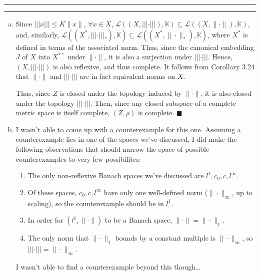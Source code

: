 \documentclass[11pt]{article}
\newcounter{questionCounter}
\newcounter{partCounter}[questionCounter]
\newenvironment{question}[2][\arabic{questionCounter}]{%
    \setcounter{partCounter}{0}%
    \vspace{.25in} \hrule \vspace{0.5em}%
        \noindent{\bf #2}%
    \vspace{0.8em} \hrule \vspace{.10in}%
    \addtocounter{questionCounter}{1}%
}{}
\renewcommand{\qed}{\quad $\blacksquare$}
\newcommand{\K}{\mathbb{K}} %
\renewcommand{\L}{\mathcal{L}} %
\begin{document}
\begin{question}{Problem 6}
\begin{enumerate}[(a)]
\item Since $|||x||| \leq K\|x\|$, $\forall x \in X$,
$\L((X,|||\cdot|||),\K) \subseteq \L((X,\|\cdot\|),\K)$, and, similarly,
$\L((X^*,|||\cdot|||_*),\K) \subseteq \L((X^*,\|\cdot\|_*),\K)$, where $X^*$ is
defined in terms of the associated norm. Thus, since the canonical embedding
$J$ of $X$ into $X^{**}$ under $\|\cdot\|$, it is also a surjection under
$|||\cdot|||$. Hence, $(X,|||\cdot|||)$ is also reflexive, and thus complete.
It follows from Corollary 3.24 that $\|\cdot\|$ and $|||\cdot|||$ are in fact
equivalent norms on $X$.

Thus, since $Z$ is closed under the topology induced by $\|\cdot\|$, it is also
closed under the topology $|||\cdot|||$. Then, since any closed subspace of a
complete metric space is itself complete, $(Z,\rho)$ is complete. \qed

\item I wasn't able to come up with a counterexample for this one. Assuming a
counterexample lies in one of the spaces we've discussed, I did make the
following observations that should narrow the space of possible counterexamples
to very few possibilites:
\begin{enumerate}
\item The only non-reflexive Banach spaces we've discussed are
$l^1,c_0,c,l^{\infty}$.
\item Of these spaces, $c_0,c,l^{\infty}$ have only one well-defined norm
($\|\cdot\|_{\infty}$, up to scaling), so the counterexample should be in
$l^1$.
\item In order for $(l^1,\|\cdot\|)$ to be a Banach space,
$\|\cdot\| = \|\cdot\|_1$.
\item The only norm that $\|\cdot\|_1$ bounds by a constant multiple is
$\|\cdot\|_{\infty}$, so $|||\cdot||| = \|\cdot\|_{\infty}$.
\end{enumerate}
I wasn't able to find a counterexample beyond this though\dots
\end{enumerate}
\end{question}
\end{document}

